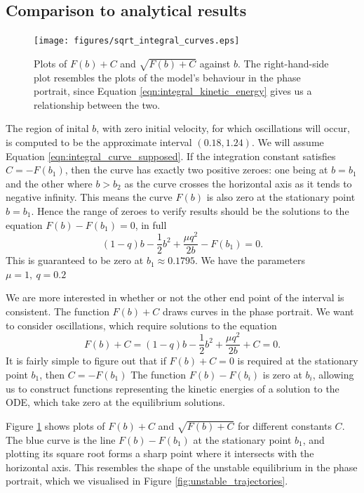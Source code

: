 \subsection{Comparison to analytical results}

\begin{figure}[h!]
    \centering
    \texttt{[image: figures/sqrt\_integral\_curves.eps]}
    \caption{
        Plots of $F(b)+C$ and $\sqrt{F(b)+C}$ against $b$.
        The right-hand-side plot resembles the plots of the model's behaviour in the phase portrait,
        since Equation \ref{eqn:integral_kinetic_energy} gives us a relationship between the two.
    }
    \label{fig:sqrt_curves}
\end{figure}
The region of inital $b$, with zero initial velocity, for which oscillations will occur,
is computed to be the approximate interval $(0.18,1.24)$.
We will assume Equation \ref{eqn:integral_curve_supposed}.
If the integration constant satisfies $C = -F(b_1)$,
then the curve has exactly two positive zeroes:
one being at $b=b_1$ and the other where $b>b_2$ as the curve crosses the horizontal axis as it tends to negative infinity.
This means the curve \(F(b)\) is also zero at the stationary point \(b = b_1\).
Hence the range of zeroes to verify results should be the solutions to the equation $F(b)-F(b_1)=0$, in full
\begin{equation}
    (1-q)b - \frac{1}{2}b^2 + \frac{\mu q^2}{2b} - F(b_1) = 0.
    \label{eqn:integral_curves_zeroes_explicit}
\end{equation}
This is guaranteed to be zero at $b_1 \approx 0.1795$.
We have the parameters \(\mu = 1,~ q = 0.2\)

We are more interested in whether or not the other end point of the interval is consistent.
The function \(F(b) + C\) draws curves in the phase portrait.
We want to consider oscillations, which require solutions to the equation
\begin{equation}
    F(b) + C = (1-q)b - \frac{1}{2}b^2 + \frac{\mu q^2}{2b} + C = 0.
\end{equation}
It is fairly simple to figure out that if \(F(b)+C=0\) is required at the stationary point \(b_1\),
then \(C = -F(b_1)\)
The function \(F(b)-F(b_i)\) is zero at $b_i$, allowing us to construct functions representing the kinetic energies of a solution to the ODE,
which take zero at the equilibrium solutions.

Figure \ref{fig:sqrt_curves} shows plots of $F(b)+C$ and $\sqrt{F(b)+C}$ for different constants $C$.
The blue curve is the line $F(b)-F(b_1)$ at the stationary point $b_1$,
and plotting its square root forms a sharp point where it intersects with the horizontal axis.
This resembles the shape of the unstable equilibrium in the phase portrait,
which we visualised in Figure \ref{fig:unstable_trajectories}.


